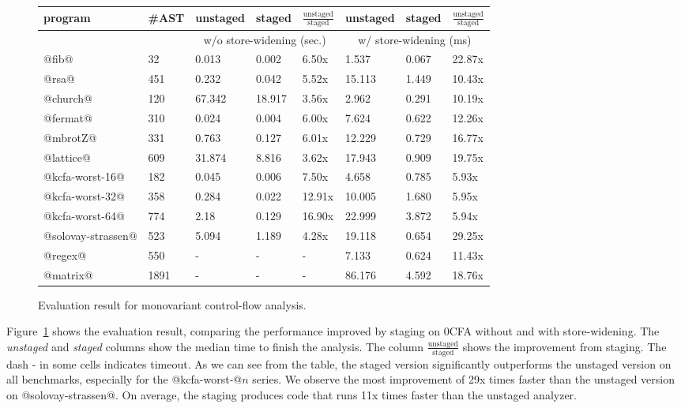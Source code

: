 \begin{figure}[h]
\footnotesize
\begin{tabular}{@{}ll|lll|lll@{}}
\toprule
    program             &\#AST & unstaged   & staged     & $\frac{\text{unstaged}}{\text{staged}}$ & unstaged   & staged    & $\frac{\text{unstaged}}{\text{staged}}$  \\ 
    \midrule
                        &      & \multicolumn{3}{c}{w/o store-widening (sec.)}  &  \multicolumn{3}{c}{w/ store-widening (ms)}\\
    \midrule
    @fib@               & 32   & 0.013      & 0.002      & 6.50x      & 1.537 & 0.067  &  22.87x       \\
    @rsa@               & 451  & 0.232      & 0.042      & 5.52x      & 15.113& 1.449 &  10.43x       \\
    @church@            & 120  & 67.342     & 18.917     & 3.56x      & 2.962 & 0.291 &  10.19x       \\
    @fermat@            & 310  & 0.024      & 0.004      & 6.00x      & 7.624 & 0.622 &  12.26x       \\
    @mbrotZ@            & 331  & 0.763      & 0.127      & 6.01x      & 12.229& 0.729 &  16.77x       \\
    @lattice@           & 609  & 31.874     & 8.816      & 3.62x      & 17.943& 0.909 &  19.75x      \\
    @kcfa-worst-16@     & 182  & 0.045      & 0.006      & 7.50x      & 4.658 & 0.785 &  5.93x     \\
    @kcfa-worst-32@     & 358  & 0.284      & 0.022      & 12.91x     & 10.005& 1.680 &  5.95x     \\
    @kcfa-worst-64@     & 774  & 2.18       & 0.129      & 16.90x     & 22.999& 3.872 &  5.94x     \\
    @solovay-strassen@  & 523  & 5.094      & 1.189      & 4.28x      & 19.118& 0.654 &  29.25x      \\
    @regex@             & 550  & -          & -          & -          & 7.133 & 0.624 &  11.43x      \\
    @matrix@            & 1891 & -          & -          & -          & 86.176& 4.592 &  18.76x      \\
    \bottomrule
\end{tabular}
\caption{Evaluation result for monovariant control-flow analysis.} \label{evaluation_result}
\end{figure}

Figure~\ref{evaluation_result} shows the evaluation result, comparing the
performance improved by staging on 0CFA without and with store-widening. The
\textit{unstaged} and \textit{staged} columns show the median time to finish the
analysis. The column $\frac{\text{unstaged}}{\text{staged}}$
shows the improvement from staging. The dash - in some cells indicates timeout.
As we can see from the table, the staged version significantly outperforms the
unstaged version on all benchmarks, especially for the @kcfa-worst-@$n$ series.
We observe the most improvement of 29x times faster than the unstaged version on
@solovay-strassen@. On average, the staging produces code that runs 11x times faster
than the unstaged analyzer.

